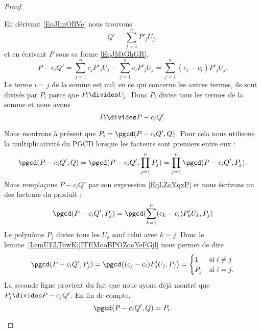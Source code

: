 \begin{proof}
\begin{subproof}

		En dérivant \eqref{EqJImORVe} nous trouvons
		\begin{equation}
			Q'=\sum_{j=1}^nP'_jU_j,
		\end{equation}
		et en écrivant \( P\) sous sa forme \eqref{EqJMtGhGR},
		\begin{equation}    \label{EqLZoYqxP}
			P-c_iQ'=\sum_{j=1}^nc_jP'_jU_j-\sum_{j=1}^nc_iP'_jU_j=\sum_{j=1}^n(c_j-c_i)P'_jU_j.
		\end{equation}
		Le terme \( i=j\) de la somme est nul; en ce qui concerne les autres termes, ils sont divisés par \( P_i\) parce que \( P_i\divides U_j\). Donc \( P_i\) divise tous les termes de la somme et nous avons
		\begin{equation}
			P_i\divides P-c_iQ'.
		\end{equation}


		Nous montrons à présent que \( P_i=\pgcd(P-c_iQ',Q)\). Pour cela nous utilisons la multiplicativité du PGCD lorsque les facteurs sont premiers entre eux :
		\begin{equation}
			\pgcd(P-c_iQ',Q)=\pgcd(P-c_iQ',\prod_{j=1}^nP_j)=\prod_{j=1}^n\pgcd(P-c_iQ',P_j).
		\end{equation}
		Nous remplaçons \( P-c_iQ'\) par son expression \eqref{EqLZoYqxP} et nous écrivons un des facteurs du produit :
		\begin{equation}
			\pgcd(P-c_iQ',P_j)=\pgcd(\sum_{k=1}^n(c_k-c_i)P'_kU_k,P_j)
		\end{equation}
		Le polynôme \( P_j\) divise tous les \( U_k\) sauf celui avec \( k=j\). Donc le lemme~\ref{LemUELTuwK}\ref{ITEMooBPOZooYeFGjl} nous permet de dire
		\begin{equation}
			\pgcd(P-c_iQ',P_j)=\pgcd\big( (c_j-c_i)P'_jU_j,P_j \big)=\begin{cases}
				1   & \text{si } i\neq j     \\
				P_j & \text{si } i=j\text{.}
			\end{cases}
		\end{equation}
		La seconde ligne provient du fait que nous ayons déjà montré que \( P_j\divides P-c_jQ'\). En fin de compte,
		\begin{equation}
			\pgcd(P-c_iQ',Q)=P_i.
		\end{equation}



\end{subproof}
\end{proof}
